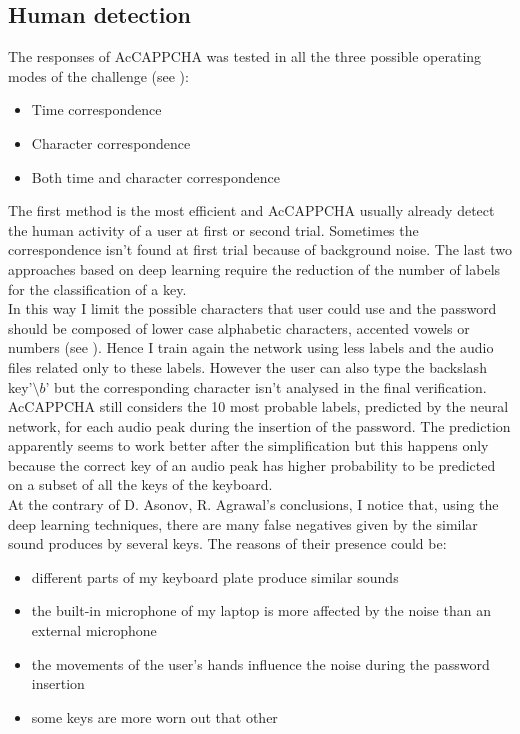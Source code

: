 \subsection{Human detection}
The responses of AcCAPPCHA was tested in all the three possible operating modes of the challenge (see ): 
\begin{itemize}
\item{Time correspondence}
\item{Character correspondence}
\item{Both time and character correspondence}
\end{itemize}
The first method is the most efficient and AcCAPPCHA usually already detect the human activity of a user at first or second trial. Sometimes the correspondence isn't found at first trial because of background noise. The last two approaches based on deep learning require the reduction of the number of labels for the classification of a key.\\
In this way I limit the possible characters that user could use and the password should be composed of lower case alphabetic characters, accented vowels or numbers (see ). Hence I train again the network using less labels and the audio files related only to these labels. However the user can also type the backslash key'$\setminus b$' but the corresponding character isn't analysed in the final verification.\\
AcCAPPCHA still considers the 10 most probable labels, predicted by the neural network, for each audio peak during the insertion of the password. The prediction apparently seems to work better after the simplification but this happens only because the correct key of an audio peak has higher probability to be predicted on a subset of all the keys of the keyboard.\\
At the contrary of D. Asonov, R. Agrawal's conclusions\cite{keyboard_acoustic}, I notice that, using the deep learning techniques, there are many false negatives given by the similar sound produces by several keys. The reasons of their presence could be:
\begin{itemize}
\item{different parts of my keyboard plate produce similar sounds}
\item{the built-in microphone of my laptop is more affected by the noise than an external microphone}
\item{the movements of the user's hands influence the noise during the password insertion}
\item{some keys are more worn out that other} 
\end{itemize}
